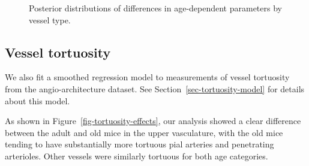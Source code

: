 \documentclass[
  letterpaper,
  DIV=11,
  numbers=noendperiod,
  oneside]{scrartcl}
\theoremstyle{plain}
\theoremstyle{remark}
\begin{document}
\begin{figure}


\caption{\label{fig-density-effects}Posterior distributions of
differences in age-dependent parameters by vessel type.}

\end{figure}%

\subsection{Vessel tortuosity}\label{vessel-tortuosity}

We also fit a smoothed regression model to measurements of vessel
tortuosity from the angio-architecture dataset. See
Section~\ref{sec-tortuosity-model} for details about this model.

As shown in Figure~\ref{fig-tortuosity-effects}, our analysis showed a
clear difference between the adult and old mice in the upper
vasculature, with the old mice tending to have substantially more
tortuous pial arteries and penetrating arterioles. Other vessels were
similarly tortuous for both age categories.
\end{document}
